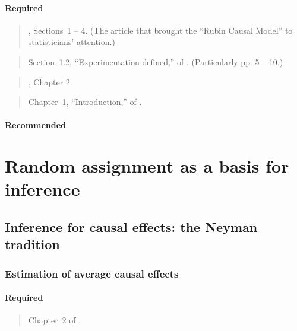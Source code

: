 \documentclass[12pt]{article}
\begin{document}
\paragraph*{Required}

\begin{verse}, Sections~1 -- 4. (The article that brought the ``Rubin Causal Model'' to  statisticians' attention.)\end{verse}

\begin{verse} Section~1.2, ``Experimentation defined,''  of
.  (Particularly pp. 5 -- 10.) \end{verse}

\begin{verse} , Chapter 2. \end{verse}

\begin{verse} Chapter~1, ``Introduction,'' of .\end{verse}

\paragraph*{Recommended}

\begin{verse}  \end{verse}

\section{Random assignment as a basis for inference}

\subsection{Inference for causal effects: the Neyman tradition}

\subsubsection{Estimation of average causal effects}

\paragraph*{Required}

\begin{verse}
  Chapter~2 of .
\end{verse}
\end{document}
